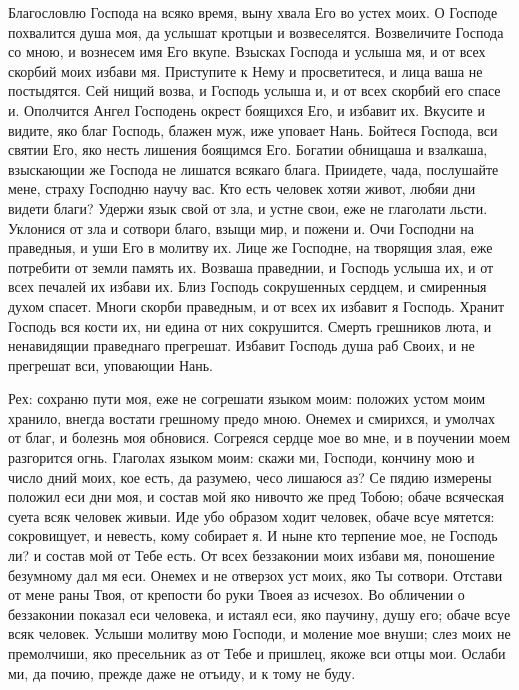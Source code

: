 \begin{mymulticols}
Благословлю Господа на всяко время, выну хвала Его во устех моих. О Господе похвалится душа моя, да услышат кротцыи и возвеселятся. Возвеличите Господа со мною, и вознесем имя Его вкупе. Взысках Господа и услыша мя, и от всех скорбий моих избави мя. Приступите к Нему и просветитеся, и лица ваша не постыдятся. Сей нищий возва, и Господь услыша и, и от всех скорбий его спасе и. Ополчится Ангел Господень окрест боящихся Его, и избавит их. Вкусите и видите, яко благ Господь, блажен муж, иже уповает Нань. Бойтеся Господа, вси святии Его, яко несть лишения боящимся Его. Богатии обнищаша и взалкаша, взыскающии же Господа не лишатся всякаго блага. Приидете, чада, послушайте мене, страху Господню научу вас. Кто есть человек хотяи живот, любяи дни видети благи? Удержи язык свой от зла, и устне свои, еже не глаголати льсти. Уклонися от зла и сотвори благо, взыщи мир, и пожени и. Очи Господни на праведныя, и уши Его в молитву их. Лице же Господне, на творящия злая, еже потребити от земли память их. Возваша праведнии, и Господь услыша их, и от всех печалей их избави их. Близ Господь сокрушенных сердцем, и смиренныя духом спасет. Многи скорби праведным, и от всех их избавит я Господь. Хранит Господь вся кости их, ни едина от них сокрушится. Смерть грешников люта, и ненавидящии праведнаго прегрешат. Избавит Господь душа раб Своих, и не прегрешат вси, уповающии Нань.




Рех: сохраню пути моя, еже не согрешати языком моим: положих устом моим хранило, внегда востати грешному предо мною. Онемех и смирихся, и умолчах от благ, и болезнь моя обновися. Согреяся сердце мое во мне, и в поучении моем разгорится огнь. Глаголах языком моим: скажи ми, Господи, кончину мою и число дний моих, кое есть, да разумею, чесо лишаюся аз? Се пядию измерены положил еси дни моя, и состав мой яко нивочто же пред Тобою; обаче всяческая суета всяк человек живыи. Иде убо образом ходит человек, обаче всуе мятется: сокровищует, и невесть, кому собирает я. И ныне кто терпение мое, не Господь ли? и состав мой от Тебе есть. От всех беззаконии моих избави мя, поношение безумному дал мя еси. Онемех и не отверзох уст моих, яко Ты сотвори. Отстави от мене раны Твоя, от крепости бо руки Твоея аз исчезох. Во обличении о беззаконии показал еси человека, и истаял еси, яко паучину, душу его; обаче всуе всяк человек. Услыши молитву мою Господи, и моление мое внуши; слез моих не премолчиши, яко пресельник аз от Тебе и пришлец, якоже вси отцы мои. Ослаби ми, да почию, прежде даже не отъиду, и к тому не буду.



\end{mymulticols}
